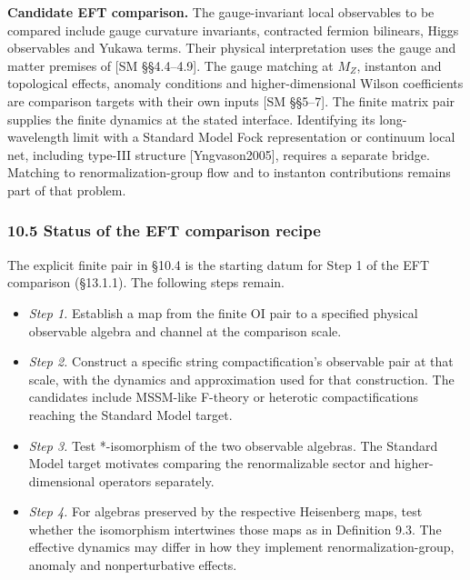 \documentclass[
]{article}
\providecommand{\tightlist}{%
  \setlength{\itemsep}{0pt}\setlength{\parskip}{0pt}}
\begin{document}
\textbf{Candidate EFT comparison.} The gauge-invariant local observables
to be compared include gauge curvature invariants, contracted fermion
bilinears, Higgs observables and Yukawa terms. Their physical
interpretation uses the gauge and matter premises of {[}SM
§§4.4--4.9{]}. The gauge matching at \(M_Z\), instanton and topological
effects, anomaly conditions and higher-dimensional Wilson coefficients
are comparison targets with their own inputs {[}SM §§5--7{]}. The finite
matrix pair supplies the finite dynamics at the stated interface.
Identifying its long-wavelength limit with a Standard Model Fock
representation or continuum local net, including type-III structure
{[}Yngvason2005{]}, requires a separate bridge. Matching to
renormalization-group flow and to instanton contributions remains part
of that problem.

\hypertarget{status-of-the-eft-comparison-recipe}{%
\subsubsection{10.5 Status of the EFT comparison
recipe}\label{status-of-the-eft-comparison-recipe}}

The explicit finite pair in §10.4 is the starting datum for Step 1 of
the EFT comparison (§13.1.1). The following steps remain.

\begin{itemize}
\tightlist
\item
  \emph{Step 1.} Establish a map from the finite OI pair to a specified
  physical observable algebra and channel at the comparison scale.
\item
  \emph{Step 2.} Construct a specific string compactification's
  observable pair at that scale, with the dynamics and approximation
  used for that construction. The candidates include MSSM-like F-theory
  or heterotic compactifications reaching the Standard Model target.
\item
  \emph{Step 3.} Test *-isomorphism of the two observable algebras. The
  Standard Model target motivates comparing the renormalizable sector
  and higher-dimensional operators separately.
\item
  \emph{Step 4.} For algebras preserved by the respective Heisenberg
  maps, test whether the isomorphism intertwines those maps as in
  Definition 9.3. The effective dynamics may differ in how they
  implement renormalization-group, anomaly and nonperturbative effects.
\end{itemize}
\end{document}
